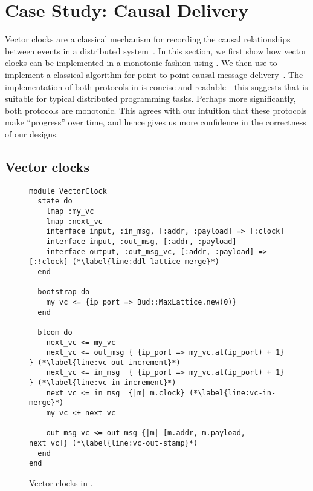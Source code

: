 \section{Case Study: Causal Delivery}
\label{sec:causal}

Vector clocks are a classical mechanism for recording the causal relationships
between events in a distributed system~\cite{Fidge1988,Mattern1989}. In this
section, we first show how vector clocks can be implemented in a monotonic
fashion using \lang. We then use \lang to implement a classical algorithm for
point-to-point causal message delivery~\cite{Schiper1989}. The implementation of
both protocols in \lang is concise and readable---this suggests that \lang is
suitable for typical distributed programming tasks. Perhaps more significantly,
both protocols are monotonic. This agrees with our intuition that these
protocols make ``progress'' over time, and hence gives us more confidence in the
correctness of our designs.


\subsection{Vector clocks}
\begin{figure}[t]
\begin{scriptsize}
\begin{lstlisting}
module VectorClock
  state do
    lmap :my_vc
    lmap :next_vc
    interface input, :in_msg, [:addr, :payload] => [:clock]
    interface input, :out_msg, [:addr, :payload]
    interface output, :out_msg_vc, [:addr, :payload] => [:!clock] (*\label{line:ddl-lattice-merge}*)
  end

  bootstrap do
    my_vc <= {ip_port => Bud::MaxLattice.new(0)}
  end

  bloom do
    next_vc <= my_vc
    next_vc <= out_msg { {ip_port => my_vc.at(ip_port) + 1} } (*\label{line:vc-out-increment}*)
    next_vc <= in_msg  { {ip_port => my_vc.at(ip_port) + 1} } (*\label{line:vc-in-increment}*)
    next_vc <= in_msg  {|m| m.clock} (*\label{line:vc-in-merge}*)
    my_vc <+ next_vc

    out_msg_vc <= out_msg {|m| [m.addr, m.payload, next_vc]} (*\label{line:vc-out-stamp}*)
  end
end
\end{lstlisting}
\end{scriptsize}
\caption{Vector clocks in \lang.}
\label{fig:vector-clock-src}
\end{figure}

